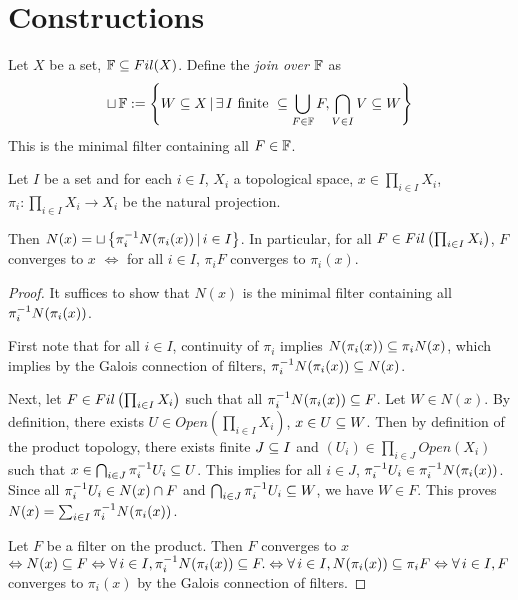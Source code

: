 \documentclass[main.tex]{subfiles}
\begin{document}
\section{Constructions}

\begin{dfn} 
  
  Let $X$ be a set, $\mathbb{F} \subseteq Fil(X)$.
  Define the \emph{join over $\mathbb{F}$} as 
  \[
    \sqcup\,\mathbb{F} := \left\{
      W \subseteq X \,|\, \exists\, I\text{ finite } \subseteq \bigcup_{F \in \mathbb{F}} F,
      \bigcap_{V \in I} V \subseteq W
    \right\}
  \]
  This is the minimal filter containing all $F \in \mathbb{F}$.
\end{dfn}

\begin{thm} 
  
  Let $I$ be a set and for each $i \in I$, $X_i$ a topological space,
  $x \in \prod_{i\in I} X_i$,
  $\pi_i : \prod_{i \in I} X_i \to X_i$ be the natural projection.

  Then $N(x) = \sqcup\left\{\pi_i^{-1} N(\pi_i(x)) \,|\, i \in I\right\}$.
  In particular, 
  for all $F \in Fil\left(\prod_{i\in I} X_i\right)$, 
  $F$ converges to $x$ $\iff$ 
  for all $i \in I$, $\pi_i F$ converges to $\pi_i(x)$.
\end{thm}
\begin{proof}
  It suffices to show that $N(x)$ is the minimal filter containing
  all $\pi_i^{-1} N(\pi_i(x))$.

  First note that for all $i \in I$, continuity of $\pi_i$ implies 
  $N(\pi_i(x)) \subseteq \pi_iN(x)$,
  which implies by the Galois connection of filters, 
  $\pi_i^{-1} N(\pi_i(x)) \subseteq N(x)$.

  Next, let $F \in Fil\left(\prod_{i\in I}X_i\right)$ such that 
  all $\pi_i^{-1} N(\pi_i(x)) \subseteq F$.
  Let $W \in N(x)$.
  By definition, 
  there exists $U \in Open(\prod_{i\in I}X_i)$, $x \in U \subseteq W$.
  Then by definition of the product topology, 
  there exists finite $J \subseteq I$ and $(U_i) \in \prod_{i \in J} Open(X_i)$
  such that $x \in \bigcap_{i \in J} \pi_i^{-1} U_i \subseteq U$.
  This implies for all $i\in J$, $\pi_i^{-1} U_i \in \pi_i^{-1} N(\pi_i(x))$.
  Since all $\pi_i^{-1} U_i \in N(x) \cap F$
  and $\bigcap_{i\in J}\pi_i^{-1} U_i \subseteq W$,
  we have $W \in F$.
  This proves $N(x) = \sum_{i \in I} \pi_i^{-1} N(\pi_i(x))$.
  
  Let $F$ be a filter on the product.
  Then $F$ converges to $x$ $\Leftrightarrow N(x) \subseteq F \Leftrightarrow 
  \forall\, i\in I, \pi_i^{-1} N(\pi_i(x)) \subseteq F. \Leftrightarrow 
  \forall\, i\in I, N(\pi_i(x)) \subseteq \pi_i F \Leftrightarrow
  \forall\, i \in I, F$ converges to $\pi_i(x)$ 
  by the Galois connection of filters.  
\end{proof}
\end{document}
